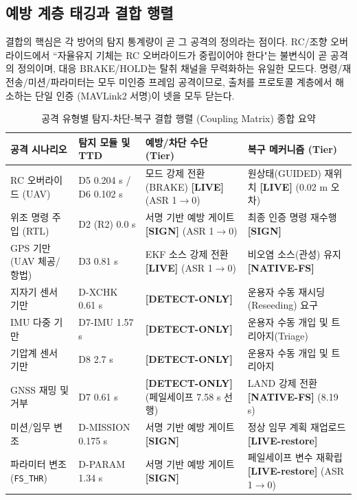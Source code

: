 \subsection{예방 계층 태깅과 결합 행렬}

결합의 핵심은 각 방어의 탐지 통계량이 곧 그 공격의 정의라는 점이다. RC/조향 오버라이드에서 ``자율유지 기체는 RC 오버라이드가 중립이어야 한다"는 불변식이 곧 공격의 정의이며, 대응 BRAKE/HOLD는 탈취 채널을 무력화하는 유일한 모드다. 명령/재전송/미션/파라미터는 모두 미인증 프레임 공격이므로, 출처를 프로토콜 계층에서 해소하는 단일 인증 (MAVLink2 서명)이 넷을 모두 닫는다.

\begin{table}[t!]
\centering
\caption{공격 유형별 탐지-차단-복구 결합 행렬 (Coupling Matrix) 종합 요약}
\label{tab:coupling_matrix}
\renewcommand{\arraystretch}{1.3}
\small
\begin{tabularx}{\textwidth}{@{} >{\raggedright\arraybackslash}p{3.8cm} >{\raggedright\arraybackslash}X >{\raggedright\arraybackslash}X >{\raggedright\arraybackslash}X @{}}
\toprule
\textbf{공격 시나리오} & \textbf{탐지 모듈 및 TTD} & \textbf{예방/차단 수단 (Tier)} & \textbf{복구 메커니즘 (Tier)} \\
\midrule
RC 오버라이드 (UAV) & D5 0.204 s / D6 0.102 s & 모드 강제 전환(BRAKE) \textbf{[LIVE]} (ASR 1$\to$0) & 원상태(GUIDED) 재위치 \textbf{[LIVE]} (0.02 m 오차) \\
위조 명령 주입 (RTL) & D2 (R2) 0.0 s & 서명 기반 예방 게이트 \textbf{[SIGN]} (ASR 1$\to$0) & 최종 인증 명령 재수행 \textbf{[SIGN]} \\
GPS 기만 (UAV 체공/항법) & D3 0.81 s & EKF 소스 강제 전환 \textbf{[LIVE]} (ASR 1$\to$0) & 비오염 소스(관성) 유지 \textbf{[NATIVE-FS]} \\
지자기 센서 기만 & D-XCHK 0.61 s & \textbf{[DETECT-ONLY]} & 운용자 수동 재시딩(Reseeding) 요구 \\
IMU 다중 기만 & D7-IMU 1.57 s & \textbf{[DETECT-ONLY]} & 운용자 수동 개입 및 트리아지(Triage) \\
기압계 센서 기만 & D8 2.7 s & \textbf{[DETECT-ONLY]} & 운용자 수동 개입 및 트리아지 \\
GNSS 재밍 및 거부 & D7 0.61 s & \textbf{[DETECT-ONLY]} (페일세이프 7.58 s 선행) & LAND 강제 전환 \textbf{[NATIVE-FS]} (8.19 s) \\
미션/임무 변조 & D-MISSION 0.175 s & 서명 기반 예방 게이트 \textbf{[SIGN]} & 정상 임무 계획 재업로드 \textbf{[LIVE-restore]} \\
파라미터 변조 (\texttt{FS\_THR}) & D-PARAM 1.34 s & 서명 기반 예방 게이트 \textbf{[SIGN]} & 페일세이프 변수 재확립 \textbf{[LIVE-restore]} (ASR 1$\to$0) \\

\end{tabularx}
\end{table}

